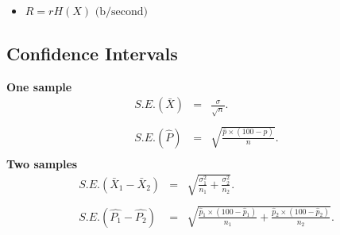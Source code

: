 \documentclass[a4paper,12pt]{article}
\begin{document}
\begin{itemize}
\begin{itemize}
\item $R = rH(X) \mbox{      (b/second)}$
\end{itemize}

\newpage
\subsection*{Confidence Intervals}
{\bf One sample}
\begin{eqnarray*} S.E.(\bar{X})&=&\frac{\sigma}{\sqrt{n}}.\\\\
S.E.(\hat{P})&=&\sqrt{\frac{\hat{p}\times(100-\hat{p})}{n}}.\\
\end{eqnarray*}
{\bf Two samples}
\begin{eqnarray*}
S.E.(\bar{X}_1-\bar{X}_2)&=&\sqrt{\frac{\sigma^2_1}{n_1}+\frac{\sigma_2^2}{n_2}}.\\\\
S.E.(\hat{P_1}-\hat{P_2})&=&\sqrt{\frac{\hat{p}_1\times(100-\hat{p}_1)}{n_1}+\frac{\hat{p}_2\times(100-\hat{p}_2)}{n_2}}.\\\\
\end{eqnarray*}

\end{itemize}
\end{document}

